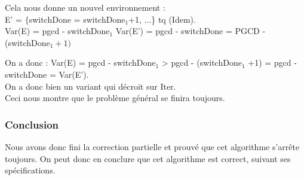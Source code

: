 Cela nous donne un nouvel environnement :\\

E' = $\{$switchDone = switchDone$_{1}$+1, ...\} tq (Idem).\\

Var(E) = pgcd - switchDone$_{1}$
Var(E') = pgcd - switchDone = PGCD - (switchDone$_{1}+1)$

On a donc : Var(E) = pgcd - switchDone$_{1}$ > pgcd - (switchDone$_1$ +1) = pgcd - switchDone = Var(E').\\

On a donc bien un variant qui décroit sur Iter.\\

Ceci nous montre que le problème général se finira toujours. 

\subsubsection*{Conclusion}

Nous avons donc fini la correction partielle et prouvé que cet algorithme s'arrête toujours. On peut donc en conclure que cet algorithme est correct, suivant ses spécifications. 

